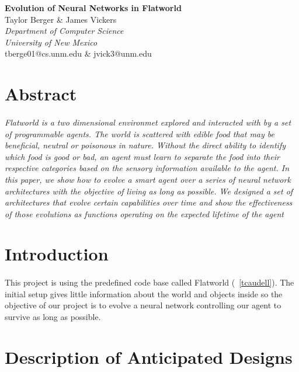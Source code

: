 \documentclass[12pt]{article}
\begin{document}
\begin{center}
\textbf{\huge{Evolution of Neural Networks in Flatworld}}\\
\vspace{5mm}
\Large{Taylor Berger \& James Vickers}\\
\vspace{3mm}
\Large{\emph{Department of Computer Science}}\\
\Large{\emph{University of New Mexico}}\\
\vspace{3mm}
\normalsize{tberge01@cs.unm.edu \& jvick3@unm.edu}\\
\end{center}

\section*{Abstract}
\paragraph{}\emph{Flatworld is a two dimensional environmet explored and
  interacted with by a set of programmable agents. The world is
  scattered with edible food that may be beneficial, neutral or
  poisonous in nature. Without the direct ability to identify which
  food is good or bad, an agent must learn to separate the food into
  their respective categories based on the sensory information
  available to the agent. In this paper, we show how to evolve a smart
  agent over a series of neural network architectures with the
  objective of living as long as possible. We designed a set of
  architectures that evolve certain capabilities over time and show
  the effectiveness of those evolutions as functions operating on the
  expected lifetime of the agent}
\linespread{1.5}
\setlength{\parindent}{1.5cm}

\section{Introduction}
\paragraph{} This project is using the predefined code base called 
Flatworld (~\ref{tcaudell}). The initial setup gives little information
about the world and objects inside so the objective of our project is
to evolve a neural network controlling our agent to survive as long as
possible. 
\section{Description of Anticipated Designs}
\end{document}
